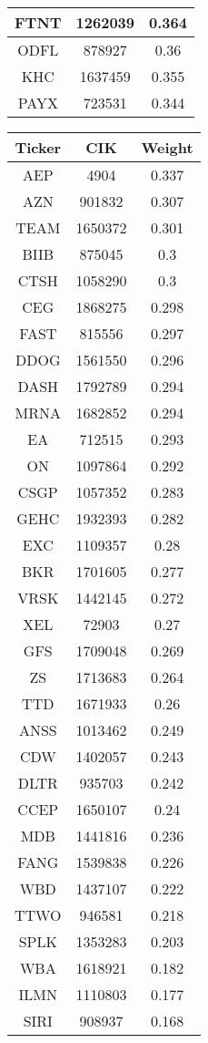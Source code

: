 \documentclass[logo,bsc,singlespacing,parskip]{infthesis}
\begin{document}
\begin{longtable}
\begin{tabular}[t]{|c|c|c|}
FTNT & 1262039 & 0.364 \\ \hline
ODFL & 878927 & 0.36 \\ \hline
KHC & 1637459 & 0.355 \\ \hline
PAYX & 723531 & 0.344 \\ \hline
                \end{tabular}
                \hfill
                \begin{tabular}[t]{|c|c|c|}
                    \hline
                    \textbf{Ticker} & \textbf{CIK} & \textbf{Weight} \\ \hline
AEP & 4904 & 0.337 \\ \hline
AZN & 901832 & 0.307 \\ \hline
TEAM & 1650372 & 0.301 \\ \hline
BIIB & 875045 & 0.3 \\ \hline
CTSH & 1058290 & 0.3 \\ \hline
CEG & 1868275 & 0.298 \\ \hline
FAST & 815556 & 0.297 \\ \hline
DDOG & 1561550 & 0.296 \\ \hline
DASH & 1792789 & 0.294 \\ \hline
MRNA & 1682852 & 0.294 \\ \hline
EA & 712515 & 0.293 \\ \hline
ON & 1097864 & 0.292 \\ \hline
CSGP & 1057352 & 0.283 \\ \hline
GEHC & 1932393 & 0.282 \\ \hline
EXC & 1109357 & 0.28 \\ \hline
BKR & 1701605 & 0.277 \\ \hline
VRSK & 1442145 & 0.272 \\ \hline
XEL & 72903 & 0.27 \\ \hline
GFS & 1709048 & 0.269 \\ \hline
ZS & 1713683 & 0.264 \\ \hline
TTD & 1671933 & 0.26 \\ \hline
ANSS & 1013462 & 0.249 \\ \hline
CDW & 1402057 & 0.243 \\ \hline
DLTR & 935703 & 0.242 \\ \hline
CCEP & 1650107 & 0.24 \\ \hline
MDB & 1441816 & 0.236 \\ \hline
FANG & 1539838 & 0.226 \\ \hline
WBD & 1437107 & 0.222 \\ \hline
TTWO & 946581 & 0.218 \\ \hline
SPLK & 1353283 & 0.203 \\ \hline
WBA & 1618921 & 0.182 \\ \hline
ILMN & 1110803 & 0.177 \\ \hline
SIRI & 908937 & 0.168 \\ \hline
                \end{tabular}    
                \label{appendix_qqq}
                \caption{2023 QQQ Portfolio.}
                
\end{longtable}
\end{document}
